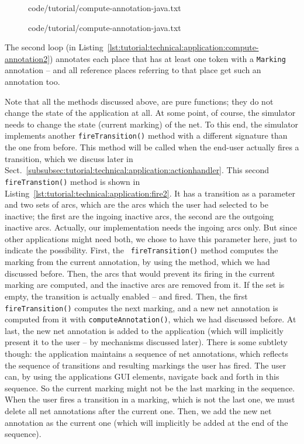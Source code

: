 \begin{figure}[htbp!]
%
  {code/tutorial/compute-annotation-java.txt}
\end{figure}

\begin{figure}[htbp!]
%
  {code/tutorial/compute-annotation-java.txt}
\end{figure}

The second loop (in
Listing~\ref{lst:tutorial:technical:application:compute-annotation2}) annotates
each place that has at least one token with
a {\tt Marking} annotation -- and all reference places referring to that
place get such an annotation too.

Note that all the methods discussed above, are pure functions; they
do not change the state of the application at all. At some point, of course,
the simulator needs to change the state (current marking) of the net.
To this end, the simulator implements another {\tt fireTransition()} method
with a different signature than the one from before. This method will be called
when the end-user actually fires a transition, which we discuss later in
Sect.~\ref{subsubsec:tutorial:technical:application:actionhandler}.
This second {\tt fireTranstion()} method is shown in
Listing~\ref{lst:tutorial:technical:application:fire2}.
It has a transition as a parameter and two sets of arcs, which are the arcs
which the user had selected to be inactive; the first are the ingoing inactive
arcs, the second are the outgoing inactive arcs. Actually, our implementation
needs the ingoing arcs only. But since other applications might need both, we chose to
have this parameter here, just to indicate the possibility. First, the {\tt
fireTransition()} method computes the marking from the current annotation, by
using the method, which we had discussed before. Then, the arcs that would
prevent its firing in the current marking are computed, and the inactive arcs
are removed from it. If the set is empty, the transition is actually enabled -- and fired.
Then, the first {\tt fireTransition()} computes the next marking, and a new
net annotation is computed from it with {\tt computeAnnotation()}, which we had
discussed before. At last, the new net annotation is added to the
application (which will implicitly present it to the user -- by mechanisms
discussed later). There is some subtlety though: the application maintains a
sequence of net annotations, which reflects the sequence of transitions and
resulting markings the user has fired. The user can, by using the applications
GUI elements, navigate back and forth in this sequence.
So the current marking might not be the last marking in the sequence. When the
user fires a transition in a marking, which is not the last one, we must delete
all net annotations after the current one. Then, we add the new net annotation
as the current one (which will implicitly be added at the end of the sequence).

